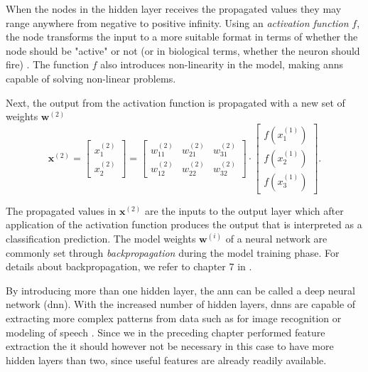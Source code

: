 When the nodes in the hidden layer receives the propagated values they may range anywhere from negative to positive infinity. Using an \textit{activation function} $f$, the node transforms the input to a more suitable format in terms of whether the node should be "active" or not (or in biological terms, whether the neuron should fire) \citep{kriesel_2007}. The function $f$ also introduces non-linearity in the model, making \gls{ann}s capable of solving non-linear problems. 

Next, the output from the activation function is propagated with a new set of weights $\mathbf{w}^{(2)}$
\begin{equation}
	\mathbf{x}^{(2)}=\begin{bmatrix}x_1^{(2)} \\ x_2^{(2)} \end{bmatrix} = 
	\begin{bmatrix} w_{11}^{(2)} & w_{21}^{(2)} & w_{31}^{(2)} \\ w_{12}^{(2)} & w_{22}^{(2)} & w_{32}^{(2)} \end{bmatrix}\cdot \begin{bmatrix}f(x_1^{(1)}) \\ f(x_2^{(1)}) \\ f(x_3^{(1)}) \end{bmatrix}.
\end{equation}

The propagated values in $\mathbf{x}^{(2)}$ are the inputs to the output layer which after application of the activation function produces the output that is interpreted as a classification prediction. The model weights $\mathbf{w}^{(i)}$ of a neural network are commonly set through \textit{backpropagation} during the model training phase. For details about backpropagation, we refer to chapter 7 in \citep{rojas_1996}.

By introducing more than one hidden layer, the \gls{ann} can be called a deep neural network (\gls{dnn}). With the increased number of hidden layers, \gls{dnn}s are capable of extracting more complex patterns from data such as for image recognition \citep{szegedy_liu_jia_sermanet_reed_anguelov_erhan_vanhoucke_rabinovich_2018} or modeling of speech \citep{hinton_deng_yu_dahl_mohamed_jaitly_senior_vanhoucke_nguyen_sainath_2012}. Since we in the preceding chapter performed feature extraction the it should however not be necessary in this case to have more hidden layers than two, since useful features are already readily available.

